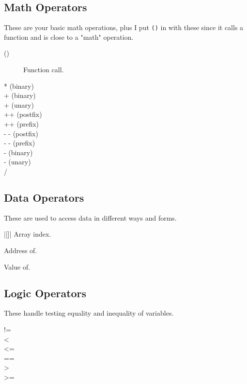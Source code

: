 \subsection{Math Operators}

These are your basic math operations, plus I put \verb|()| in
with these since it calls a function and is close to a "math"
operation.

\begin{description}
\item[()] Function call.
\item[* (binary)]
\item[+ (binary)]
\item[+ (unary)]
\item[++ (postfix)]
\item[++ (prefix)]
\item[- - (postfix)]
\item[- - (prefix)]
\item[- (binary)]
\item[- (unary)]
\item[/]
\end{description}

\subsection{Data Operators}

These are used to access data in different ways and forms.

\begin{description}
\item[->]
\item[.]
\item|[]| Array index.
\item[sizeof]
\item[\& (unary)] Address of.
\item[* (unary)] Value of.
\end{description}

\subsection{Logic Operators}

These handle testing equality and inequality of variables.

\begin{description}
\item[!=]
\item[<]
\item[<=]
\item[==]
\item[>]
\item[>=]
\end{description}

